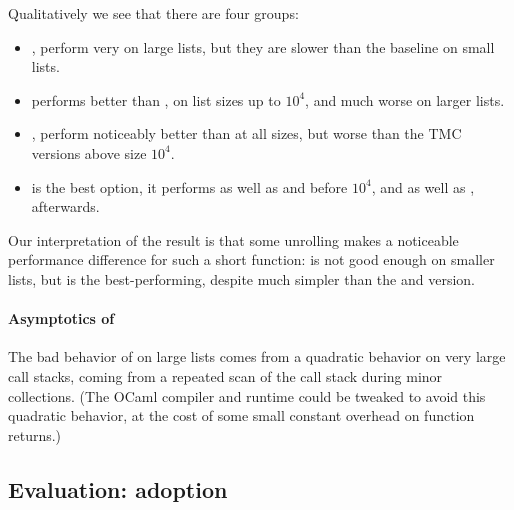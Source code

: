 Qualitatively we see that there are four groups:
\begin{itemize}
\item {},  perform very on large lists, but they
  are slower than the baseline on small lists.
\item {} performs better than ,  on list sizes up to $10^4$, and much worse on larger lists.
\item {},  perform noticeably better than  at all sizes,
  but worse than the TMC versions above size $10^4$.
\item {} is the best option, it performs as well as  and  before $10^4$, and as well as ,  afterwards.
\end{itemize}
Our interpretation of the result is that some unrolling makes a noticeable performance difference for such a short function:  is not good enough on smaller lists, but  is the best-performing, despite much simpler than the  and  version.

\paragraph{Asymptotics of } The bad behavior of  on large lists comes from a quadratic behavior on very large call stacks, coming from a repeated scan of the call stack during minor collections. (The OCaml compiler and runtime could be tweaked to avoid this quadratic behavior, at the cost of some small constant overhead on function returns.)


\subsection{Evaluation: adoption}


